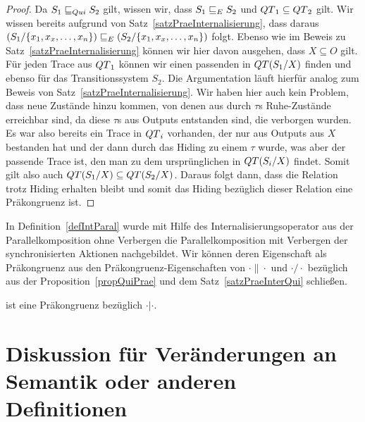 \begin{proof}
  Da $S_1\sqsubseteq _{Qui} S_2$ gilt, wissen wir, dass $S_1\sqsubseteq _E S_2$ und $QT{}_1\subseteq
  QT{}_2$ gilt. Wir wissen bereits aufgrund von
  Satz~\ref{satzPraeInternalisierung}, dass daraus $(S_1/\{x_1,x_x,\dots
  ,x_n\})\sqsubseteq _E (S_2/\{x_1,x_x,\dots ,x_n\})$ folgt. Ebenso wie im Beweis zu
  Satz~\ref{satzPraeInternalisierung} können wir hier davon ausgehen, dass
  $X\subseteq O$ gilt. Für jeden Trace aus $QT{}_1$ können wir einen passenden
  in $QT{}(S_1/X)$ finden und ebenso für das Transitionssystem $S_2$. Die
  Argumentation läuft hierfür analog zum Beweis von
  Satz~\ref{satzPraeInternalisierung}. Wir haben hier auch kein Problem, dass
  neue Zustände hinzu kommen, von denen aus durch $\tau$s Ruhe-Zustände
  erreichbar sind, da diese $\tau$s aus Outputs entstanden sind, die verborgen
  wurden. Es war also bereits ein Trace in $QT{}_i$ vorhanden, der nur aus
  Outputs aus $X$ bestanden hat und der dann durch das Hiding zu einem $\tau$
  wurde, was aber der passende Trace ist, den man zu dem ursprünglichen in
  $QT{}(S_i/X)$ findet. Somit gilt
  also auch $QT{}(S_1/X)\subseteq QT{}(S_2/X)$. Daraus folgt dann, dass die
  Relation \QRel{} trotz Hiding erhalten bleibt und somit das Hiding bezüglich
  dieser Relation eine Präkongruenz ist.
\end{proof}

In Definition~\ref{defIntParal} wurde mit Hilfe des Internalisierungsoperator
aus der Parallelkomposition ohne Verbergen die Parallelkomposition mit
Verbergen der synchronisierten Aktionen nachgebildet. Wir können deren
Eigenschaft als Präkongruenz aus den Präkongruenz-Eigenschaften von
$\cdot\|\cdot$ und $\cdot /\cdot$ bezüglich \QRel{} aus der
Proposition~\ref{propQuiPrae} und dem Satz~\ref{satzPraeInterQui} schließen.

\begin{kor}
  \QRel{} ist eine Präkongruenz bezüglich $\cdot |\cdot$.
\end{kor}

\section{Diskussion für Veränderungen an Semantik oder anderen Definitionen}

